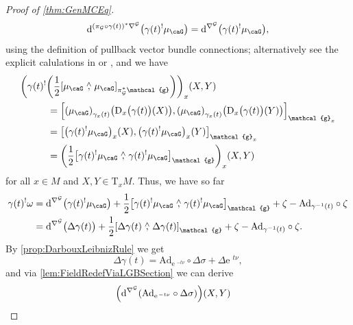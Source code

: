 \documentclass[reqno,a4paper,oneside]{amsart}
\newcommand\mutot{\mu_\caG}
\newcommand{\e}{\ensuremath{\mathrm{e\;\!}}}
\theoremstyle{plain}
\theoremstyle{remark}
\theoremstyle{definition}
\begin{document}
\begin{proof}[Proof of \ref{thm:GenMCEq}]
\begin{equation*}
\mathrm{d}^{\mleft(\pi_{\mathcal{G}}\circ \gamma(t)\mright)^*\nabla^{\mathcal{G}}} \mleft( \gamma(t)^!\mutot\mright)
=
\mathrm{d}^{\nabla^{\mathcal{G}}} \mleft( \gamma(t)^!\mutot\mright),
\end{equation*}
using the definition of pullback vector bundle connections; alternatively see the explicit calulations in \cite[Appendix, Prop.\ A.1, Eq.\ (A.1)]{My1stpaper} or \cite[Appendix, Prop.\ A.1.1, Eq.\ (A.2)]{MyThesis}, and we have
\begin{align*}
&\mleft(\gamma(t)^!\mleft( \frac{1}{2} \mleft[ \mutot \stackrel{\wedge}{,} \mutot \mright]_{\pi_{\mathcal{G}}^*\mathcal{g}} \mright)\mright)_x(X,Y)
\\
&\hspace{1cm}=
\mleft[ \mleft(\mutot\mright)_{\gamma_x(t)}\mleft( \mathrm{D}_x\bigl(\gamma(t)\bigr)(X) \mright), 
\mleft(\mutot\mright)_{\gamma_x(t)}\mleft( \mathrm{D}_x\bigl(\gamma(t)\bigr)(Y) \mright) \mright]_{\mathcal{g}_{x}}
\\
&\hspace{1cm}=
\mleft[ \mleft(\gamma(t)^!\mutot\mright)_{x}(X), 
\mleft(\gamma(t)^!\mutot\mright)_{x}(Y) \mright]_{\mathcal{g}_{x}}
\\
&\hspace{1cm}=
\mleft( \frac{1}{2}
	\mleft[ \gamma(t)^!\mutot \stackrel{\wedge}{,}
	\gamma(t)^!\mutot \mright]_{\mathcal{g}}
\mright)_x(X,Y)
\end{align*}
for all $x \in M$ and $X, Y \in \mathrm{T}_xM$. Thus, we have so far
\begin{align}\label{PullbackofMCGeneralCurvPlusExtra}
\gamma(t)^!\omega
&=
\mathrm{d}^{\nabla^{\mathcal{G}}} \mleft( \gamma(t)^!\mutot\mright)
	+ \frac{1}{2}
	\mleft[ \gamma(t)^!\mutot \stackrel{\wedge}{,}
	\gamma(t)^!\mutot \mright]_{\mathcal{g}}
	+ \zeta
	- \mathrm{Ad}_{\gamma^{-1}(t)} \circ \zeta
\nonumber
\\
&=
\mathrm{d}^{\nabla^{\mathcal{G}}} \bigl( \Delta\gamma(t) \bigr)
	+ \frac{1}{2} \mleft[ \Delta\gamma(t) \stackrel{\wedge}{,} \Delta\gamma(t) \mright]_{\mathcal{g}}
	+ \zeta
	- \mathrm{Ad}_{\gamma^{-1}(t)} \circ \zeta.
\end{align}
By \ref{prop:DarbouxLeibnizRule} we get
\begin{equation*}
\Delta\gamma(t)
=
\mathrm{Ad}_{\e^{-t\nu}} \circ \Delta \sigma
	+ \Delta \e^{t\nu},
\end{equation*}
and via \ref{lem:FieldRedefViaLGBSection} we can derive
\begin{align*}
&\mleft(\mathrm{d}^{\nabla^{\mathcal{G}}} \mleft(\mathrm{Ad}_{\e^{-t\nu}} \circ \Delta \sigma \mright)\mright)(X, Y)

\end{align*}
\end{proof}
\end{document}
